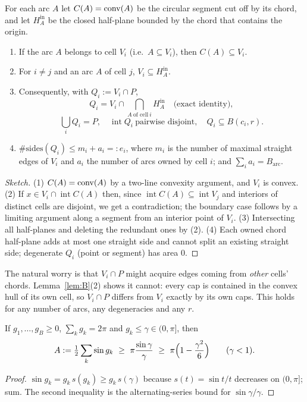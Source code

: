 \begin{lemma}[Lemma B: the caps belong to their own cell; $Q_i=V_i\cap P$ exactly]\label{lem:B}
For each arc $A$ let $C(A)=\operatorname{conv}(A)$ be the circular segment cut off by its chord, and let
$H_A^{\mathrm{in}}$ be the closed half-plane bounded by the chord that contains the origin.
\begin{enumerate}[leftmargin=1.6em,itemsep=2pt]
\item If the arc $A$ belongs to cell $V_i$ (i.e.\ $A\subseteq V_i$), then $C(A)\subseteq V_i$.
\item For $i\ne j$ and an arc $A$ of cell $j$, $V_i\subseteq H_A^{\mathrm{in}}$.
\item Consequently, with $Q_i:=V_i\cap P$,
\[
Q_i=V_i\cap\bigcap_{A\ \text{of cell}\ i}H_A^{\mathrm{in}}
\quad\text{(exact identity)},
\]
\[
\bigcup_iQ_i=P,\quad \operatorname{int}Q_i\ \text{pairwise disjoint},\quad Q_i\subseteq B(c_i,r).
\]
\item $\#\text{sides}(Q_i)\le m_i+a_i=:e_i$, where $m_i$ is the number of maximal straight edges
of $V_i$ and $a_i$ the number of arcs owned by cell $i$; and $\sum_ia_i=B_{\mathrm{arc}}$.
\end{enumerate}
\end{lemma}
\begin{proof}[Sketch]
(1) $C(A)=\operatorname{conv}(A)$ by a two-line convexity argument, and $V_i$ is convex. (2) If
$x\in V_i\cap\operatorname{int}C(A)$ then, since $\operatorname{int}C(A)\subseteq
\operatorname{int}V_j$ and interiors of distinct cells are disjoint, we get a contradiction; the
boundary case follows by a limiting argument along a segment from an interior point of $V_i$.
(3) Intersecting all half-planes and deleting the redundant ones by (2). (4) Each owned chord
half-plane adds at most one straight side and cannot split an existing straight side; degenerate
$Q_i$ (point or segment) has area $0$.
\end{proof}

\begin{remark}
The natural worry is that $V_i\cap P$ might acquire edges coming from \emph{other} cells' chords.
Lemma~\ref{lem:B}(2) shows it cannot: every cap is contained in the convex hull of its own cell, so
$V_i\cap P$ differs from $V_i$ exactly by its own caps. This holds for any number of arcs, any
degeneracies and any $r$.
\end{remark}

\begin{lemma}\label{lem:C}
If $g_1,\dots,g_B\ge0$, $\sum_kg_k=2\pi$ and $g_k\le\gamma\in(0,\pi]$, then
\[
A:=\tfrac12\sum_k\sin g_k\ \ge\ \pi\frac{\sin\gamma}{\gamma}\ \ge\ \pi\Bigl(1-\frac{\gamma^2}6\Bigr)
\qquad(\gamma<1).
\]
\end{lemma}
\begin{proof}
$\sin g_k=g_k\,s(g_k)\ge g_k\,s(\gamma)$ because $s(t)=\sin t/t$ decreases on $(0,\pi]$; sum. The
second inequality is the alternating-series bound for $\sin\gamma/\gamma$.
\end{proof}

